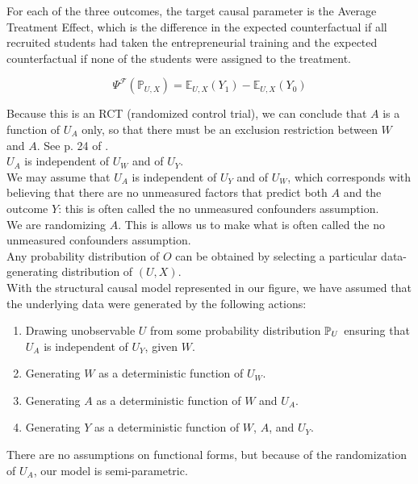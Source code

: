 \documentclass[oneside, notitlepage]{book}
\begin{document}
For each of the three outcomes, the target causal parameter is the Average Treatment Effect, which is the difference in the expected counterfactual if all recruited students had taken the entrepreneurial training and the expected counterfactual if none of the students were assigned to the treatment.

\[ \Psi^{\mathcal{F}}(\mathbb{P}_{U,X}) = \mathbb{E}_{U,X}(Y_1) - \mathbb{E}_{U,X}(Y_0)  \]

Because this is an RCT (randomized control trial), we can conclude that $A$ is a function of $U_A$ only, so that there must be an exclusion restriction between $W$ and $A$. See p. 24 of \cite{tlb}. \\

$U_A$ is independent of $U_W$ and of $U_Y$. \\

We may assume that $U_A$ is independent of $U_Y$ and of $U_W$, which corresponds with believing that there are no unmeasured factors that predict both $A$ and the outcome $Y$: this is often called the no unmeasured confounders assumption. \\

We are randomizing $A$. This is allows us to make what is often called the no unmeasured confounders assumption. \\

Any probability distribution of $O$ can be obtained by selecting a particular data-generating distribution of $(U,X)$. \\

With the structural causal model represented in our figure, we have assumed that the underlying data were generated by the following actions: \\


\begin{enumerate}
\item Drawing unobservable $U$ from some probability distribution $\mathbb{P}_U$ ensuring that $U_A$ is independent of $U_Y$, given $W$.
\item Generating $W$ as a deterministic function of $U_W$.
\item Generating $A$ as a deterministic function of $W$ and $U_A$.
\item Generating $Y$ as a deterministic function of $W$, $A$, and $U_Y$.
\end{enumerate} 

There are no assumptions on functional forms, but because of the randomization of $U_A$, our model is semi-parametric.\\
\end{document}
